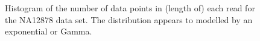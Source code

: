 \begin{figure}
	\centering

\caption{\label{fig:n-hist}Histogram of the number of data points in (length of) each read for the NA12878 data set. The distribution appears to modelled by an exponential or Gamma.}
\end{figure}
